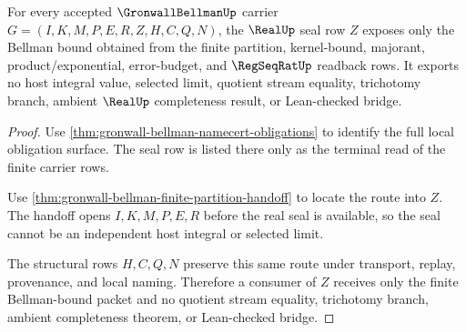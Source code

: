 \begin{theorem}
\label{thm:gronwall-bellman-real-seal-nonescape}
For every accepted $\GronwallBellmanUp$ carrier $G=(I,K,M,P,E,R,Z,H,C,Q,N)$, the $\RealUp$ seal row $Z$ exposes only the Bellman bound obtained from the finite partition, kernel-bound, majorant, product/exponential, error-budget, and $\RegSeqRatUp$ readback rows. It exports no host integral value, selected limit, quotient stream equality, trichotomy branch, ambient $\RealUp$ completeness result, or Lean-checked bridge.
\end{theorem}
\begin{proof}
Use \autoref{thm:gronwall-bellman-namecert-obligations} to identify the full local obligation surface. The seal row is listed there only as the terminal read of the finite carrier rows.

Use \autoref{thm:gronwall-bellman-finite-partition-handoff} to locate the route into $Z$. The handoff opens $I,K,M,P,E,R$ before the real seal is available, so the seal cannot be an independent host integral or selected limit.

The structural rows $H,C,Q,N$ preserve this same route under transport, replay, provenance, and local naming. Therefore a consumer of $Z$ receives only the finite Bellman-bound packet and no quotient stream equality, trichotomy branch, ambient completeness theorem, or Lean-checked bridge.
\end{proof}





